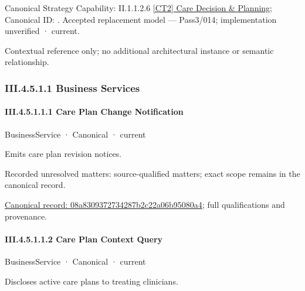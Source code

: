 {\small Canonical Strategy Capability: II.1.1.2.6 \hyperref[element:cdf9a88469ea4215b41423a6a74382fc]{[CT2] Care Decision \& Planning}; Canonical ID: \texttt{}. Accepted replacement model — Pass3/014; implementation unverified · current.}\par
Contextual reference only; no additional architectural instance or semantic relationship.\par
\subsubsection*{III.4.5.1.1 Business Services}
\label{navigation:III.4.5.1.1}

\paragraph*{III.4.5.1.1.1 Care Plan Change Notification}
\label{navigation:III.4.5.1.1.1}

\label{element:08a8309372734287b2c22a06b95080a4}
{\small BusinessService · Canonical · current}\par

Emits care plan revision notices.


{\small Recorded unresolved matters: source-qualified matters; exact scope remains in the canonical record.}\par
{\footnotesize \href{../../../../../../../../continuum/business/business-service/08a8309372734287b2c22a06b95080a4.md}{Canonical record: 08a8309372734287b2c22a06b95080a4}; full qualifications and provenance.}\par
\paragraph*{III.4.5.1.1.2 Care Plan Context Query}
\label{navigation:III.4.5.1.1.2}

\label{element:0bb4cceb0f1b4311930635d8b4c320e0}
{\small BusinessService · Canonical · current}\par

Discloses active care plans to treating clinicians.


